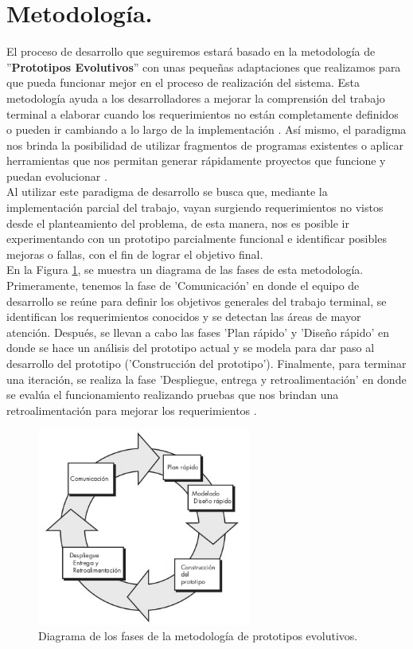 \documentclass[12pt, a4paper, titlepage]{report}
\begin{document}
	    \section{Metodolog\'ia.}
    		El proceso de desarrollo que seguiremos estará basado en la metodología de ''\textbf{Prototipos Evolutivos}'' con unas pequeñas adaptaciones que realizamos para que pueda funcionar mejor en el proceso de realización del sistema. Esta metodología ayuda a los desarrolladores a mejorar la comprensión del trabajo terminal a elaborar cuando los requerimientos no están completamente definidos o pueden ir cambiando a lo largo de la implementaci\'on . Así mismo, el paradigma nos brinda la posibilidad de utilizar fragmentos de programas existentes o aplicar herramientas que nos permitan generar rápidamente proyectos que funcione y puedan evolucionar \cite{Pressman}.\\ 
    		Al utilizar este paradigma de desarrollo se busca que, mediante la implementación parcial del trabajo, vayan surgiendo requerimientos no vistos desde el planteamiento del problema, de esta manera, nos es posible ir experimentando con un prototipo parcialmente funcional e identificar posibles mejoras o fallas, con el fin de lograr el objetivo final. \\
    		
    		En la Figura \ref{fig:metodologia}, se muestra un diagrama de las fases de esta metodología. Primeramente, tenemos la fase de 'Comunicación' en donde el equipo de desarrollo se reúne para definir los objetivos generales del trabajo terminal, se identifican los requerimientos conocidos y se detectan las áreas de mayor atención. Después, se llevan a cabo las fases 'Plan rápido' y 'Diseño rápido' en donde se hace un análisis del prototipo actual y se modela para dar paso al desarrollo del prototipo ('Construcción del prototipo'). Finalmente, para terminar una iteración, se realiza la fase 'Despliegue, entrega y retroalimentación' en donde se evalúa el funcionamiento realizando pruebas que nos brindan una retroalimentación para mejorar los requerimientos \cite{Pressman}.
    		
    		
    		 \begin{figure}[H]
    			\begin{center}	                      \includegraphics[width=7cm]{./imagenes/Introduccion/Meto_Prototipos.jpeg}
    			\caption[Fases de la metodología por prototipos]{Diagrama de los fases de la metodología de prototipos evolutivos.}
    			\label{fig:metodologia}
    			\end{center}
    		\end{figure}
    		
\end{document}
